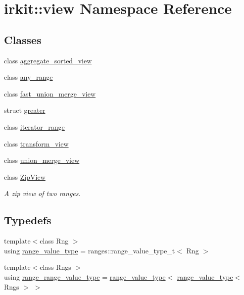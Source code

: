 \hypertarget{namespaceirkit_1_1view}{}\section{irkit\+:\+:view Namespace Reference}
\label{namespaceirkit_1_1view}
\subsection*{Classes}
\begin{DoxyCompactItemize}
\item 
class \mbox{\hyperlink{classirkit_1_1view_1_1aggregate__sorted__view}{aggregate\+\_\+sorted\+\_\+view}}
\item 
class \mbox{\hyperlink{classirkit_1_1view_1_1any__range}{any\+\_\+range}}
\item 
class \mbox{\hyperlink{classirkit_1_1view_1_1fast__union__merge__view}{fast\+\_\+union\+\_\+merge\+\_\+view}}
\item 
struct \mbox{\hyperlink{structirkit_1_1view_1_1greater}{greater}}
\item 
class \mbox{\hyperlink{classirkit_1_1view_1_1iterator__range}{iterator\+\_\+range}}
\item 
class \mbox{\hyperlink{classirkit_1_1view_1_1transform__view}{transform\+\_\+view}}
\item 
class \mbox{\hyperlink{classirkit_1_1view_1_1union__merge__view}{union\+\_\+merge\+\_\+view}}
\item 
class \mbox{\hyperlink{classirkit_1_1view_1_1ZipView}{Zip\+View}}
\begin{DoxyCompactList}\small\item\em A zip view of two ranges. \end{DoxyCompactList}\end{DoxyCompactItemize}
\subsection*{Typedefs}
\begin{DoxyCompactItemize}
\item 
{\footnotesize template$<$class Rng $>$ }\\using \mbox{\hyperlink{namespaceirkit_1_1view_aa01f8ad24d5b6600bc31631b56448817}{range\+\_\+value\+\_\+type}} = ranges\+::range\+\_\+value\+\_\+type\+\_\+t$<$ Rng $>$
\item 
{\footnotesize template$<$class Rngs $>$ }\\using \mbox{\hyperlink{namespaceirkit_1_1view_ae24f427c615bdecfcded89b8f028fb6c}{range\+\_\+range\+\_\+value\+\_\+type}} = \mbox{\hyperlink{namespaceirkit_1_1view_aa01f8ad24d5b6600bc31631b56448817}{range\+\_\+value\+\_\+type}}$<$ \mbox{\hyperlink{namespaceirkit_1_1view_aa01f8ad24d5b6600bc31631b56448817}{range\+\_\+value\+\_\+type}}$<$ Rngs $>$ $>$
\end{DoxyCompactItemize}
